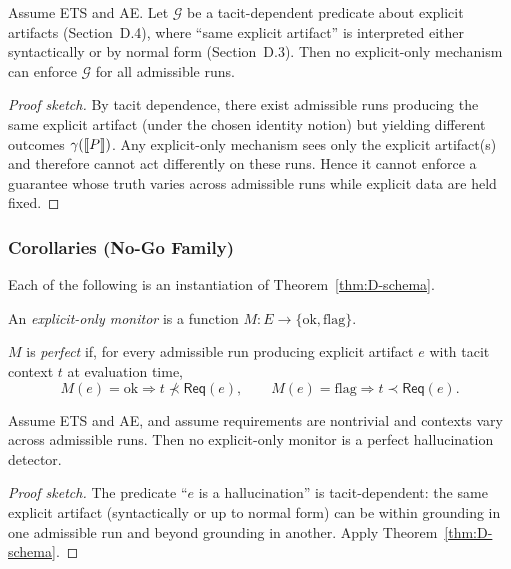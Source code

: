 \begin{theorem}\label{thm:D-schema}
Assume ETS and AE. Let $\mathcal{G}$ be a tacit-dependent predicate about explicit artifacts (Section~D.4), where ``same explicit artifact'' is interpreted either syntactically or by normal form (Section~D.3). Then no explicit-only mechanism can enforce $\mathcal{G}$ for all admissible runs.
\end{theorem}

\begin{proof}[Proof sketch]
By tacit dependence, there exist admissible runs producing the same explicit artifact (under the chosen identity notion) but yielding different outcomes $\gamma(\llbracket P \rrbracket)$. Any explicit-only mechanism sees only the explicit artifact(s) and therefore cannot act differently on these runs. Hence it cannot enforce a guarantee whose truth varies across admissible runs while explicit data are held fixed.
\end{proof}

\subsubsection{Corollaries (No-Go Family)}
Each of the following is an instantiation of Theorem~\ref{thm:D-schema}.

\begin{definition}
An \emph{explicit-only monitor} is a function $M:E\to\{\mathrm{ok},\mathrm{flag}\}$.
\end{definition}

\begin{definition}
$M$ is \emph{perfect} if, for every admissible run producing explicit artifact $e$ with tacit context $t$ at evaluation time,
\[
M(e)=\mathrm{ok}\Rightarrow t\not\prec\mathsf{Req}(e),\qquad
M(e)=\mathrm{flag}\Rightarrow t\prec\mathsf{Req}(e).
\]
\end{definition}

\begin{corollary}\label{cor:D-no-perfect-detector}
Assume ETS and AE, and assume requirements are nontrivial and contexts vary across admissible runs. Then no explicit-only monitor is a perfect hallucination detector.
\end{corollary}

\begin{proof}[Proof sketch]
The predicate ``$e$ is a hallucination'' is tacit-dependent: the same explicit artifact (syntactically or up to normal form) can be within grounding in one admissible run and beyond grounding in another. Apply Theorem~\ref{thm:D-schema}.
\end{proof}

